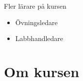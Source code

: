 \begin{frame}
  \begin{block}{Fler lärare på kursen}
    \begin{itemize}
      \item Övningsledare
      \item Labbhandledare
    \end{itemize}
  \end{block}
\end{frame}

%
%


%


\section{Om kursen}


